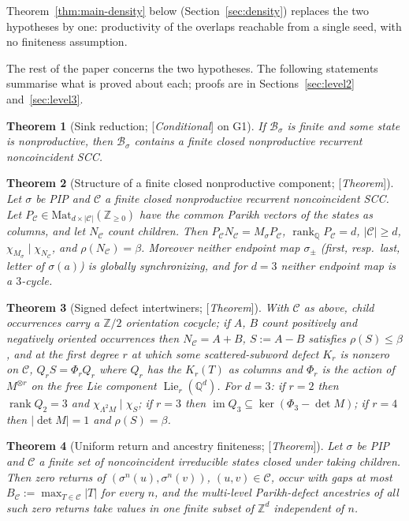 \documentclass[11pt]{amsart}
\theoremstyle{plain}
\newtheorem{theorem}{Theorem}[section]
\theoremstyle{definition}
\theoremstyle{remark}
\newcommand{\Z}{\mathbb{Z}}
\newcommand{\Q}{\mathbb{Q}}
\newcommand{\B}{\mathcal{B}}
\newcommand{\cC}{\mathcal{C}}
\newcommand{\rank}{\operatorname{rank}}
\newcommand{\Lie}{\operatorname{Lie}}
\newcommand{\Status}[1]{\textup{[\textit{#1}]}}
\begin{document}
Theorem~\ref{thm:main-density} below (Section~\ref{sec:density}) replaces the two hypotheses by one: productivity of the overlaps reachable from a single seed, with no finiteness assumption.

The rest of the paper concerns the two hypotheses. The following statements summarise what is proved about each; proofs are in Sections~\ref{sec:level2} and~\ref{sec:level3}.

\begin{theorem}[Sink reduction; \Status{Conditional} on G1]\label{thm:sink-summary}
If $\B_\sigma$ is finite and some state is nonproductive, then $\B_\sigma$ contains a finite closed nonproductive recurrent noncoincident SCC.
\end{theorem}

\begin{theorem}[Structure of a finite closed nonproductive component; \Status{Theorem}]\label{thm:structure-summary}
Let $\sigma$ be PIP and $\cC$ a finite closed nonproductive recurrent noncoincident SCC. Let $P_\cC\in\mathrm{Mat}_{d\times|\cC|}(\Z_{\ge0})$ have the common Parikh vectors of the states as columns, and let $N_\cC$ count children. Then $P_\cC N_\cC=M_\sigma P_\cC$, $\rank_\Q P_\cC=d$, $|\cC|\ge d$, $\chi_{M_\sigma}\mid\chi_{N_\cC}$, and $\rho(N_\cC)=\beta$. Moreover neither endpoint map $\sigma_\pm$ (first, resp.\ last, letter of $\sigma(a)$) is globally synchronizing, and for $d=3$ neither endpoint map is a $3$-cycle.
\end{theorem}

\begin{theorem}[Signed defect intertwiners; \Status{Theorem}]\label{thm:defect-summary}
With $\cC$ as above, child occurrences carry a $\Z/2$ orientation cocycle; if $A$, $B$ count positively and negatively oriented occurrences then $N_\cC=A+B$, $S:=A-B$ satisfies $\rho(S)\le\beta$, and at the first degree $r$ at which some scattered-subword defect $K_r$ is nonzero on $\cC$, $Q_rS=\Phi_rQ_r$ where $Q_r$ has the $K_r(T)$ as columns and $\Phi_r$ is the action of $M^{\otimes r}$ on the free Lie component $\Lie_r(\Q^d)$. For $d=3$: if $r=2$ then $\rank Q_2=3$ and $\chi_{\Lambda^2M}\mid\chi_S$; if $r=3$ then $\operatorname{im}Q_3\subseteq\ker(\Phi_3-\det M)$; if $r=4$ then $|\det M|=1$ and $\rho(S)=\beta$.
\end{theorem}

\begin{theorem}[Uniform return and ancestry finiteness; \Status{Theorem}]\label{thm:return-summary}
Let $\sigma$ be PIP and $\cC$ a finite set of noncoincident irreducible states closed under taking children. Then zero returns of $(\sigma^n(u),\sigma^n(v))$, $(u,v)\in\cC$, occur with gaps at most $B_\cC:=\max_{T\in\cC}|T|$ for every $n$, and the multi-level Parikh-defect ancestries of all such zero returns take values in one finite subset of $\Z^d$ independent of $n$.
\end{theorem}
\end{document}
